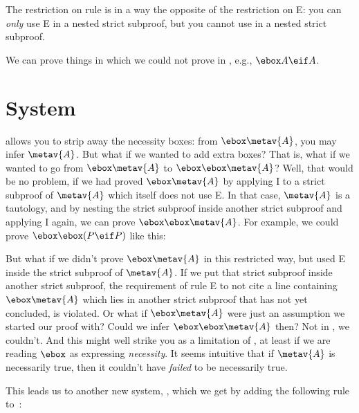 The restriction on rule \mlT{} is in a way the opposite of the restriction on \ebox E: you can \emph{only} use \ebox E in a nested strict subproof, but you cannot use \mlT{} in a nested strict subproof.

We can prove things in \mlT{} which we could not prove in \mlK, e.g., $\ebox A \eif A$.

\section{System \mlSfour}
\label{S4}

\mlT{} allows you to strip away the necessity boxes: from $\ebox \metav{A}$, you may infer $\metav{A}$. But what if we wanted to add extra boxes? That is, what if we wanted to go from $\ebox\metav{A}$ to $\ebox\ebox\metav{A}$? Well, that would be no problem, if we had proved $\ebox\metav{A}$ by applying \ebox I to a strict subproof of $\metav{A}$ which itself does not use \ebox E. In that case, $\metav{A}$ is a tautology, and by nesting the strict subproof inside another strict subproof and applying \ebox I again, we can prove $\ebox\ebox \metav{A}$. For example, we could prove $\ebox\ebox (P\eif P)$ like this:
\begin{fitchproof}
		\open
		\AS
		\open
		\AS
		\open
		\AS
		\close
		\close
		\close
\end{fitchproof}
But what if we didn't prove $\ebox\metav{A}$ in this restricted way, but used \ebox E inside the strict subproof of $\metav{A}$. If we put that strict subproof inside another strict subproof, the requirement of rule \ebox E to not cite a line containing $\ebox\metav{A}$ which lies in another strict subproof that has not yet concluded, is violated.  Or what if $\ebox\metav{A}$ were just an assumption we started our proof with? Could we infer $\ebox\ebox\metav{A}$ then? Not in  \mlT, we couldn't. And this might well strike you as a limitation of  \mlT, at least if we are reading $\ebox$ as expressing \emph{necessity}. It seems intuitive that if $\metav{A}$ is necessarily true, then it couldn't have \emph{failed} to be necessarily true.

This leads us to another new system, \mlSfour, which we get by adding the following rule to~\mlT:

